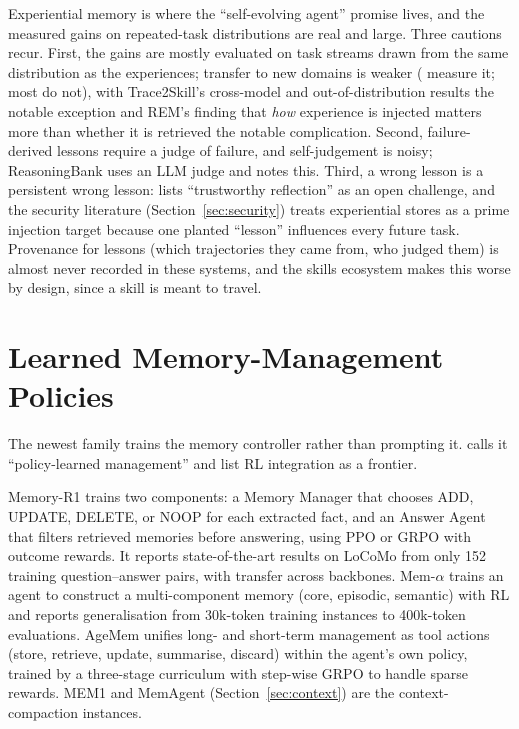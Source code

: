 \documentclass[11pt]{article}
\begin{document}
Experiential memory is where the ``self-evolving agent'' promise lives, and the measured gains on repeated-task distributions are real and large. Three cautions recur. First, the gains are mostly evaluated on task streams drawn from the same distribution as the experiences; transfer to new domains is weaker (\citet{wang2024awm} measure it; most do not), with Trace2Skill's cross-model and out-of-distribution results the notable exception and REM's finding that \emph{how} experience is injected matters more than whether it is retrieved the notable complication. Second, failure-derived lessons require a judge of failure, and self-judgement is noisy; ReasoningBank uses an LLM judge and notes this. Third, a wrong lesson is a persistent wrong lesson: \citet{du2026memory} lists ``trustworthy reflection'' as an open challenge, and the security literature (Section~\ref{sec:security}) treats experiential stores as a prime injection target because one planted ``lesson'' influences every future task. Provenance for lessons (which trajectories they came from, who judged them) is almost never recorded in these systems, and the skills ecosystem makes this worse by design, since a skill is meant to travel.


\section{Learned Memory-Management Policies}
\label{sec:rl}

The newest family trains the memory controller rather than prompting it. \citet{du2026memory} calls it ``policy-learned management'' and \citet{hu2025memoryage} list RL integration as a frontier.

Memory-R1 \citep{yan2025memoryr1} trains two components: a Memory Manager that chooses ADD, UPDATE, DELETE, or NOOP for each extracted fact, and an Answer Agent that filters retrieved memories before answering, using PPO or GRPO with outcome rewards. It reports state-of-the-art results on LoCoMo from only 152 training question--answer pairs, with transfer across backbones. Mem-$\alpha$ \citep{wang2025memalpha} trains an agent to construct a multi-component memory (core, episodic, semantic) with RL and reports generalisation from 30k-token training instances to 400k-token evaluations. AgeMem \citep{yu2026agemem} unifies long- and short-term management as tool actions (store, retrieve, update, summarise, discard) within the agent's own policy, trained by a three-stage curriculum with step-wise GRPO to handle sparse rewards. MEM1 and MemAgent (Section~\ref{sec:context}) are the context-compaction instances.
\end{document}
